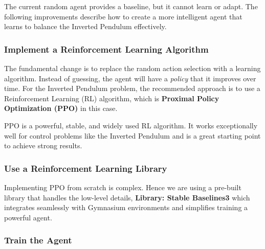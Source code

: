 \documentclass[12pt]{article}
\begin{document}
The current random agent provides a baseline, but it cannot learn or adapt. The following improvements describe how to create a more intelligent agent that learns to balance the Inverted Pendulum effectively.

\subsubsection{Implement a Reinforcement Learning Algorithm}

The fundamental change is to replace the random action selection with a learning algorithm. Instead of guessing, the agent will have a \emph{policy} that it improves over time. For the Inverted Pendulum problem, the recommended approach is to use a Reinforcement Learning (RL) algorithm, which is \textbf{Proximal Policy Optimization (PPO)} in this case.

PPO is a powerful, stable, and widely used RL algorithm. It works exceptionally well for control problems like the Inverted Pendulum and is a great starting point to achieve strong results.

\subsubsection{Use a Reinforcement Learning Library}

Implementing PPO from scratch is complex. Hence we are using a pre-built library that handles the low-level details, \textbf{Library: Stable Baselines3}  which integrates seamlessly with Gymnasium environments and simplifies training a powerful agent.

\subsubsection{Train the Agent}
\end{document}
